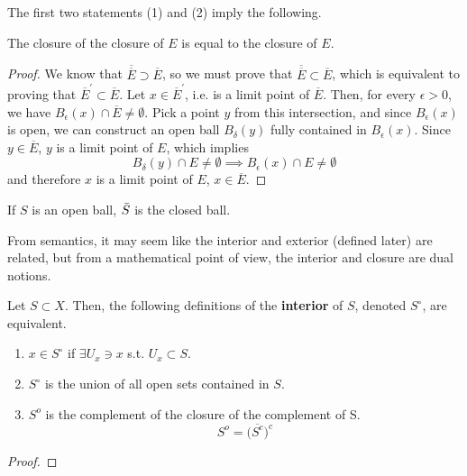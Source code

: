   The first two statements (1) and (2) imply the following. 

  \begin{corollary}
    The closure of the closure of $E$ is equal to the closure of $E$. 
  \end{corollary}
  \begin{proof}
    We know that $\overline{\overline{E}} \supset \overline{E}$, so we must prove that $\overline{\overline{E}} \subset \overline{E}$, which is equivalent to proving that $\overline{E}^\prime \subset \overline{E}$. Let $x \in \overline{E}^\prime$, i.e. is a limit point of $\overline{E}$. Then, for every $\epsilon > 0$, we have $B_\epsilon (x) \cap \overline{E} \neq \emptyset$. Pick a point $y$ from this intersection, and since $B_\epsilon (x)$ is open, we can construct an open ball $B_\delta (y)$ fully contained in $B_\epsilon (x)$. Since $y \in \overline{E}$, $y$ is a limit point of $E$, which implies 
    \begin{equation}
      B_\delta (y) \cap E \neq \emptyset \implies B_\epsilon (x) \cap E \neq \emptyset
    \end{equation}
    and therefore $x$ is a limit point of $E$, $x \in \overline{E}$. 
  \end{proof}
  

  \begin{example}
    If $S$ is an open ball, $\Bar{S}$ is the closed ball. 
  \end{example}

  From semantics, it may seem like the interior and exterior (defined later) are related, but from a mathematical point of view, the interior and closure are dual notions. 

  \begin{definition}[Interior]
    Let $S \subset X$. Then, the following definitions of the \textbf{interior} of $S$, denoted $S^\circ$, are equivalent. 
    \begin{enumerate}
      \item $x \in S^\circ$ if $\exists U_x \ni x$ s.t. $U_x \subset S$. 
      \item $S^\circ$ is the union of all open sets contained in $S$. 
      \item $S^{o}$ is the complement of the closure of the complement of S. 
      \begin{equation}
        S^{o} = \big(\overline{S^{c}}\big)^{c}
      \end{equation}
    \end{enumerate}
  \end{definition}
  \begin{proof}
    
  \end{proof}

